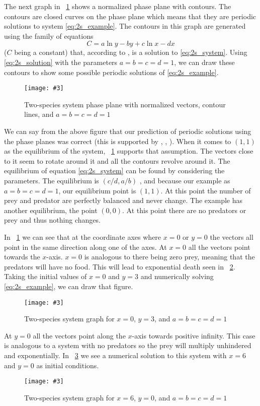 \documentclass[12pt,a4paper,reqno]{amsart}
\newcommand{\figref}[1]{\textsc{\figurename}~\ref{#1}}
\newcommand{\makefig}[4]{
\begin{figure}[#1]
    \captionsetup{justification=centering}
    \texttt{[image: \#3]}
    \caption{#4}
    \label{fig:#3}
\end{figure}
}
\begin{document}
The next graph in \figref{fig:2s_phase_plane_contours} shows a normalized phase
plane with contours. The contours are closed curves on the phase plane which
means that they are periodic solutions to system \eqref{eq:2s_example}. The
contours in this graph are generated using the family of equations 
\begin{equation}
    C = a \ln y - by + c \ln x - dx
\label{eq:2s_solution}
\end{equation}
($C$ being a constant) that, according to \cite{chauvet}, is a solution to
\eqref{eq:2s_system}. Using \eqref{eq:2s_solution} with the parameters
$a=b=c=d=1$, we can draw these contours to show some possible periodic
solutions of \eqref{eq:2s_example}.
\makefig{H}{0.9\textwidth}{2s_phase_plane_contours}{Two-species system phase
plane with normalized vectors, contour lines, and $a=b=c=d=1$}

We can say from the above figure that our prediction of periodic solutions
using the phase planes was correct (this is supported by \cite{chauvet},
\cite{hoppensteadt}, \cite{wangersky}). When it comes to $(1,1)$ as the
equilibrium of the system, \figref{fig:2s_phase_plane_contours} supports that
assumption. The vectors close to it seem to rotate around it and all the
contours revolve around it. The equilibrium of equation \eqref{eq:2s_system}
can be found by considering the parameters. The equilibrium is $(c/d, a/b)$
\cite{chauvet}, and because our example as $a=b=c=d=1$, our equilibrium point
is $(1,1)$. At this point the number of prey and predator are perfectly
balanced and never change. The example has another equilibrium, the point
$(0,0)$. At this point there are no predators or prey and thus nothing
changes.

In \figref{fig:2s_phase_plane_contours} we can see that at the coordinate axes
where $x=0$ or $y=0$ the vectors all point in the same direction along one of
the axes. At $x=0$ all the vectors point towards the $x$-axis. $x=0$ is
analogous to there being zero prey, meaning that the predators will have no
food. This will lead to exponential death seen in \figref{fig:2s_x_zero_graph}.
Taking the initial values of $x=0$ and $y=3$ and numerically solving
\eqref{eq:2s_example}, we can draw that figure.
\makefig{H}{0.85\textwidth}{2s_x_zero_graph}{Two-species
system graph for $x=0$, $y=3$, and $a=b=c=d=1$}

At $y=0$ all the vectors point along the $x$-axis towards positive infinity.
This case is analogous to a system with no predators so the prey will multiply
unhindered and exponentially. In \figref{fig:2s_y_zero_graph} we see
a numerical solution to this system with $x=6$ and $y=0$ as initial conditions. 
\makefig{h}{0.8\textwidth}{2s_y_zero_graph}{Two-species system graph for $x=6$,
$y=0$, and $a=b=c=d=1$}
\end{document}
